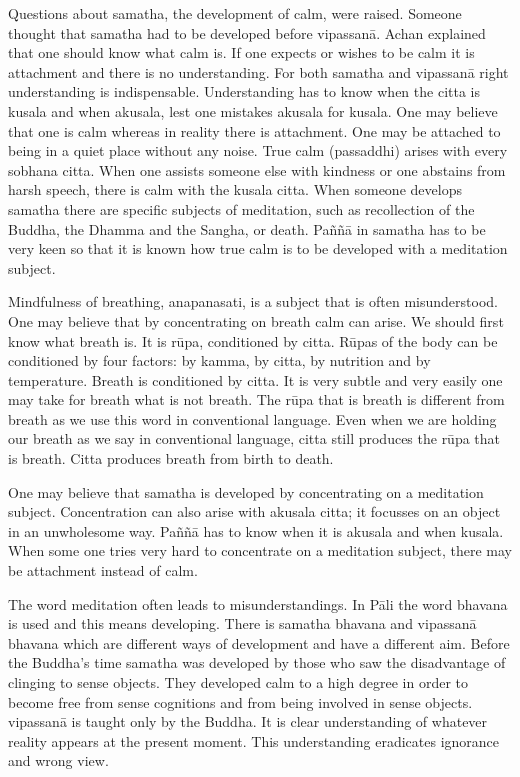 Questions about samatha, the development of calm, were raised. Someone thought 
that samatha had to be developed before vipassanā.  Achan explained that one should 
know what calm is. If one expects or wishes to be calm it is attachment and there is 
no understanding. For both samatha and vipassanā right understanding is indispensable. Understanding has to know when the citta is kusala and when akusala, lest one 
mistakes akusala for kusala. One may believe that one is calm whereas in reality 
there is attachment. One may be attached to being in a quiet place without any noise. 
True calm (passaddhi) arises with every sobhana citta. When one assists someone 
else with kindness or one abstains from harsh speech, there is calm with the kusala 
citta. When someone develops samatha there are specific subjects of meditation, such 
as recollection of the Buddha, the Dhamma and the Sangha, or death. Paññā in samatha has to be very keen so that it is known how true calm is to be developed with a 
meditation subject. 

Mindfulness of breathing, anapanasati, is a subject that is often misunderstood. One 
may believe that by concentrating on breath calm can arise. We should first know 
what breath is. It is rūpa, conditioned by citta. Rūpas of the body can be conditioned 
by four factors: by kamma, by citta, by nutrition and by temperature. Breath is conditioned by citta. It is very subtle and very easily one may take for breath what is not 
breath. The rūpa that is breath is different from breath as we use this word in conventional language. Even when we are holding our breath as we say in conventional language, citta still produces the rūpa that is breath. Citta produces breath from birth to death. 

One may believe that samatha is developed by concentrating on a meditation subject. 
Concentration can also arise with akusala citta; it focusses on an object in an unwholesome way. Paññā has to know when it is akusala and when kusala. When some 
one tries very hard to concentrate on a meditation subject, there may be attachment 
instead of calm. 

The word meditation often leads to misunderstandings. In Pāli the word bhavana is 
used and this means developing. There is samatha bhavana and vipassanā bhavana 
which are different ways of development and have a different aim. Before the Buddha’s time samatha was developed by those who saw the disadvantage of clinging to sense objects. They developed calm to a high degree in order to become free from 
sense cognitions and from being involved in sense objects. vipassanā is taught only 
by the Buddha. It is clear understanding of whatever reality appears at the present 
moment. This understanding eradicates ignorance and wrong view. 


